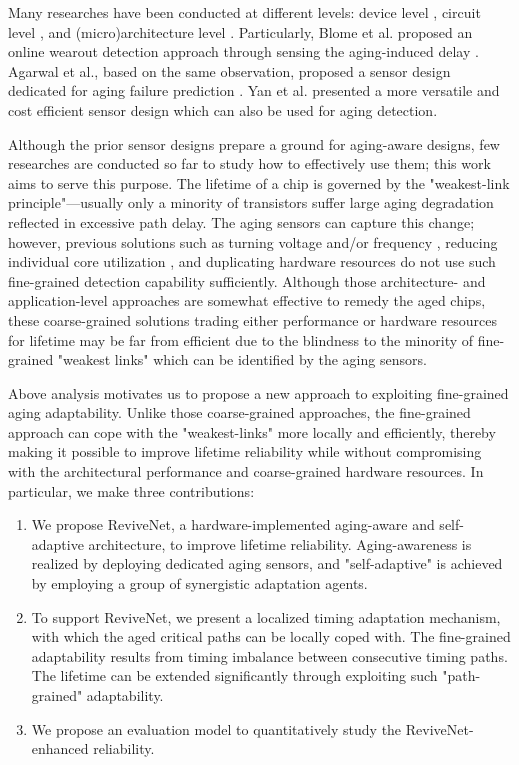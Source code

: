 Many researches have been conducted at different levels: device level \cite{DynamicNBTI_03}\cite{Modeling-and-minimization_06}, circuit level \cite{Compact-Modeling_07}\cite{Impact-of-NBTI_07}, and (micro)architecture level \cite{RAMP_04}\cite{Penelope_07}\cite{Framework_DSN07}. Particularly, Blome et al. proposed an online wearout detection approach through sensing the aging-induced delay \cite{Self-calibrating_07}. Agarwal et al., based on the same observation, proposed a sensor design dedicated for aging failure prediction \cite{failure_prediction_07}. Yan et al. presented a more versatile and cost efficient sensor design \cite{SVFD_09} which can also be used for aging detection.

Although the prior sensor designs prepare a ground for aging-aware designs, few researches are conducted so far to study how to effectively use them; this work aims to serve this purpose. The lifetime of a chip is governed by the "weakest-link principle"---usually only a minority of transistors suffer large aging degradation reflected in excessive path delay. The aging sensors can capture this change; however, previous solutions such as turning voltage and/or frequency \cite{RAMP_04}, reducing individual core utilization \cite{Facelift_08}, and duplicating hardware resources \cite{Duplication_05}\cite{WearoutRecovery_08} do not use such fine-grained detection capability sufficiently. Although those architecture- and application-level approaches are somewhat effective to remedy the aged chips, these coarse-grained solutions trading either performance or hardware resources for lifetime may be far from efficient due to the blindness to the minority of fine-grained "weakest links" which can be identified by the aging sensors.


Above analysis motivates us to propose a new approach to exploiting fine-grained aging adaptability. Unlike those coarse-grained approaches, the fine-grained approach can cope with the "weakest-links" more locally and efficiently, thereby making it possible to improve lifetime reliability while without compromising with the architectural performance and coarse-grained hardware resources. In particular, we make three contributions:
\begin{enumerate}
\item We propose ReviveNet, a hardware-implemented aging-aware and self-adaptive architecture, to improve lifetime reliability. Aging-awareness is realized by deploying dedicated aging sensors, and "self-adaptive" is achieved by employing a group of synergistic adaptation agents.

\item To support ReviveNet, we present a localized timing adaptation mechanism, with which the aged critical paths can be locally coped with. The fine-grained adaptability results from timing imbalance between consecutive timing paths. The lifetime can be extended significantly through exploiting such "path-grained" adaptability.

\item We propose an evaluation model to quantitatively study the ReviveNet-enhanced reliability.
\end{enumerate}

